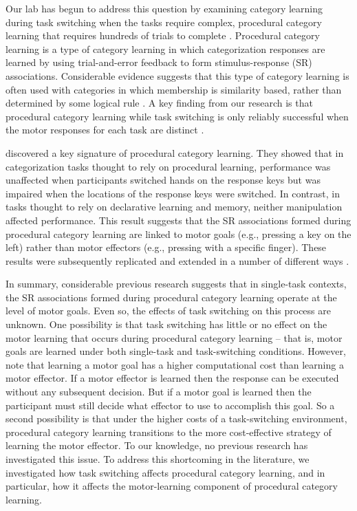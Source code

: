 \documentclass[doc, floatsintext]{apa7}
\begin{document}
Our lab has begun to address this question by examining category learning during task switching when the tasks require complex, procedural category learning that requires hundreds of trials to complete \parencite{crossley_switch_2023,
crossley_trial-by-trial_2018, turner_hierarchical_2017}. Procedural category learning is a type of category learning in which categorization responses are learned by using trial-and-error feedback to form stimulus-response (SR) associations. Considerable evidence suggests that this type of category learning is often used with categories in which membership is similarity based, rather than determined by some logical rule \parencite[for a review, see e.g.,][]{ashby_multiple_2017}. A key finding from our research is that procedural category learning while task switching is only reliably successful when the motor responses for each task are distinct \parencite{crossley_switch_2023}. 

\textcite{ashby_procedural_2003} discovered a key signature of procedural category learning. They showed that in categorization tasks thought to rely on procedural learning, performance was unaffected when participants switched hands on the response keys but was impaired when the locations of the response keys were switched. In contrast, in tasks thought to rely on declarative learning and memory, neither manipulation affected performance. This result suggests that the SR associations formed during procedural category learning are linked to motor goals (e.g., pressing a key on the left) rather than motor effectors (e.g., pressing with a specific finger). These results were subsequently replicated and extended in a number of different ways \parencite{CrossleyEtAl2012, MaddoxBohilIng2004, MaddoxEtAl2007, SpieringAshby2008}.

In summary, considerable previous research suggests that in single-task contexts, the SR associations formed during procedural category learning operate at the level of motor goals. Even so, the effects of task switching on this process are unknown. One possibility is that task switching has little or no effect on the motor learning that occurs during procedural category learning -- that is, motor goals are learned under both single-task and task-switching conditions. However, note that learning a motor goal has a higher computational cost than learning a motor effector. If a motor effector is learned then the response can be executed without any subsequent decision. But if a motor goal is learned then the participant must still decide what effector to use to accomplish this goal. So a second possibility is that under the higher costs of a task-switching environment, procedural category learning transitions to the more cost-effective strategy of learning the motor effector. To our knowledge, no previous research has investigated this issue. To address this shortcoming in the literature, we investigated how task switching affects procedural category learning, and in particular, how it affects the motor-learning component of procedural category learning. 
\end{document}
